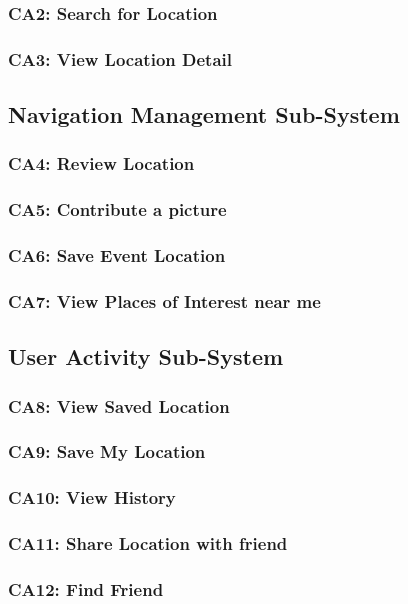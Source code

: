 \documentclass[12pt,a4paper]{article}
\begin{document}
		\subsubsection{CA2: Search for Location}
		\subsubsection{CA3: View Location Detail}
	\subsection{Navigation Management Sub-System}
		\subsubsection{CA4: Review Location}
		\subsubsection{CA5: Contribute a picture}
		\subsubsection{CA6: Save Event Location}
		\subsubsection{CA7: View Places of Interest near me}
	\subsection{User Activity Sub-System}
		\subsubsection{CA8: View Saved Location}
		\subsubsection{CA9: Save My Location}
		\subsubsection{CA10: View History}
		\subsubsection{CA11: Share Location with friend}
		\subsubsection{CA12: Find Friend}
\end{document}
